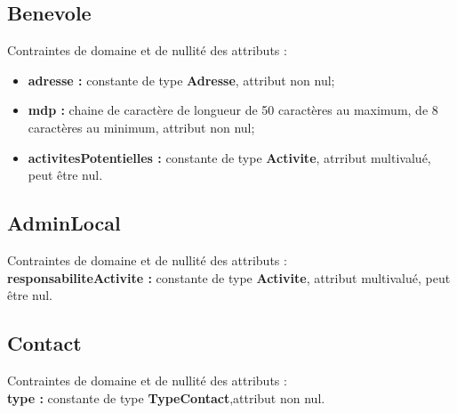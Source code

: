 \documentclass[asi, sansVersion]{picInsa}
\begin{document}
\subsection*{Benevole}
Contraintes de domaine et de nullité des attributs :
\begin{itemize}
 	\item \textbf{adresse :} constante de type \textbf{Adresse}, attribut non nul;
	\item \textbf{mdp :} chaine de caractère de longueur de 50 caractères au maximum, de 8 caractères au minimum, attribut non nul;  
	\item \textbf{activitesPotentielles :} constante de type \textbf{Activite}, atrribut multivalué, peut être nul.\\
\end{itemize}  

\subsection*{AdminLocal}
Contraintes de domaine et de nullité des attributs :\\
 \indent \indent \textbf{responsabiliteActivite :} constante de type \textbf{Activite}, attribut multivalué, peut être nul.\\

 
\subsection*{Contact}
Contraintes de domaine et de nullité des attributs :\\
\indent \indent \textbf{type :} constante de type \textbf{TypeContact},attribut non nul.\\
\end{document}
